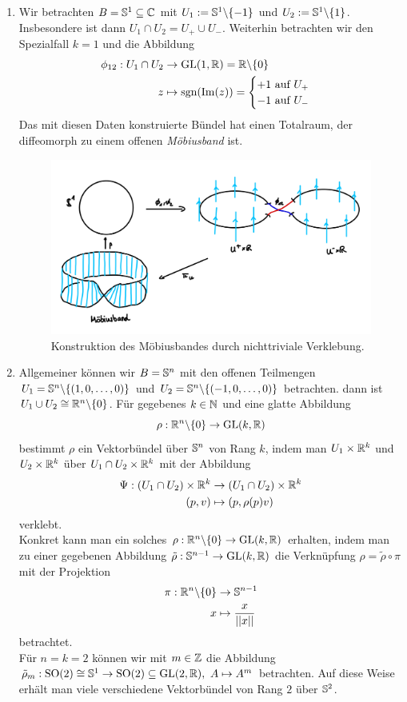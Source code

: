 \begin{beispiele}
\begin{enumerate}
\item Wir betrachten $B = \mathbb{S}^1 \subseteq \mathbb{C}$ mit $U_1 := \mathbb{S}^1 \backslash \{-1\}$ und $U_2 := \mathbb{S}^1 \backslash \{1\}$. Insbesondere ist dann $U_1 \cap U_2 = U_+ \cup U_-$. Weiterhin betrachten wir den Spezialfall $k=1$ und die Abbildung
\begin{align}
\phi_{12}: U_1 \cap U_2 &\to \text{GL}(1, \mathbb{R}) = \mathbb{R} \backslash \{0\}\\
z &\mapsto \text{sgn} (\Im (z)) = \begin{cases}
+1 \ \text{auf} \ U_+\\
-1 \ \text{auf} \ U_-
\end{cases}
\end{align}
Das mit diesen Daten konstruierte Bündel hat einen Totalraum, der diffeomorph zu einem offenen \textit{Möbiusband} ist.
\begin{figure}[H]
\label{fig:mobius}
\centering
\includegraphics[width=0.4\linewidth]{Bilder/mobius.png}
\caption{Konstruktion des Möbiusbandes durch nichttriviale Verklebung.}
\end{figure}
\item Allgemeiner können wir $B= \mathbb{S}^n$ mit den offenen Teilmengen $U_1 = \mathbb{S}^n \backslash \{(1,0, \dots, 0 ) \}$ und $U_2 = \mathbb{S}^n \backslash \{(-1, 0, \dots, 0 )\}$ betrachten. dann ist $U_1 \cup U_2 \cong \mathbb{R}^n \backslash \{0\}$. Für gegebenes $k \in \mathbb{N}$ und eine glatte Abbildung
\begin{equation}
\rho: \mathbb{R}^n \backslash \{0\} \to \text{GL}(k, \mathbb{R})
\end{equation}
bestimmt $\rho$ ein Vektorbündel über $\mathbb{S}^n$ von Rang $k$, indem man $U_1 \times \mathbb{R}^k$ und $U_2 \times \mathbb{R}^k$ über $U_1 \cap U_2 \times \mathbb{R}^k$ mit der Abbildung
\begin{align}
\Psi: (U_1 \cap U_2) \times \mathbb{R}^k &\to (U_1 \cap U_2) \times \mathbb{R}^k \\
(p,v) &\mapsto (p, \rho(p)v)
\end{align}
verklebt.\\
Konkret kann man ein solches $\rho: \mathbb{R}^n \backslash \{0\} \to \text{GL}(k, \mathbb{R})$ erhalten, indem man zu einer gegebenen Abbildung $\tilde{\rho}: \mathbb{S}^{n-1} \to \text{GL}(k, \mathbb{R})$ die Verknüpfung $\rho = \tilde{\rho} \circ \pi$ mit der Projektion
\begin{align}
\pi: \mathbb{R}^n \backslash \{0\} &\to \mathbb{S}^{n-1} \\
x &\mapsto \frac{x}{||x||}
\end{align}
betrachtet.\\
Für $n=k=2$ können wir mit $m \in \mathbb{Z}$ die Abbildung $\tilde{\rho}_m: \text{SO}(2) \cong \mathbb{S}^1 \to \text{SO}(2) \subseteq \text{GL}(2, \mathbb{R}), \ A \mapsto A^m$ betrachten. Auf diese Weise erhält man viele verschiedene Vektorbündel von Rang $2$ über $\mathbb{S}^2$.  
\end{enumerate}
\end{beispiele}
